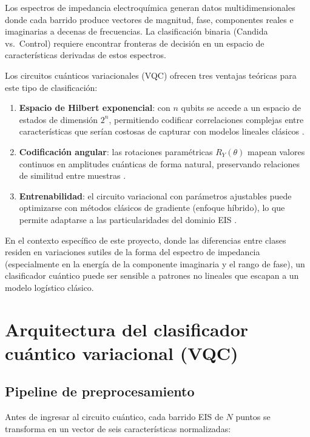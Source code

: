 \documentclass[11pt,a4paper,spanish]{book}
\begin{document}
Los espectros de impedancia electroqu\'{i}mica generan datos multidimensionales donde cada barrido produce vectores de magnitud, fase, componentes reales e imaginarias a decenas de frecuencias. La clasificaci\'{o}n binaria (Candida vs.\ Control) requiere encontrar fronteras de decisi\'{o}n en un espacio de caracter\'{i}sticas derivadas de estos espectros.

Los circuitos cu\'{a}nticos variacionales (VQC) ofrecen tres ventajas te\'{o}ricas para este tipo de clasificaci\'{o}n:

\begin{enumerate}
	\item \textbf{Espacio de Hilbert exponencial}: con $n$ qubits se accede a un espacio de estados de dimensi\'{o}n $2^n$, permitiendo codificar correlaciones complejas entre caracter\'{i}sticas que ser\'{i}an costosas de capturar con modelos lineales cl\'{a}sicos \citep{havlicek2019}.
	\item \textbf{Codificaci\'{o}n angular}: las rotaciones param\'{e}tricas $R_Y(\theta)$ mapean valores continuos en amplitudes cu\'{a}nticas de forma natural, preservando relaciones de similitud entre muestras \citep{schuld2021}.
	\item \textbf{Entrenabilidad}: el circuito variacional con par\'{a}metros ajustables puede optimizarse con m\'{e}todos cl\'{a}sicos de gradiente (enfoque h\'{i}brido), lo que permite adaptarse a las particularidades del dominio EIS \citep{pennylane2022}.
\end{enumerate}

En el contexto espec\'{i}fico de este proyecto, donde las diferencias entre clases residen en variaciones sutiles de la forma del espectro de impedancia (especialmente en la energ\'{i}a de la componente imaginaria y el rango de fase), un clasificador cu\'{a}ntico puede ser sensible a patrones no lineales que escapan a un modelo log\'{i}stico cl\'{a}sico.

\section{Arquitectura del clasificador cu\'{a}ntico variacional (VQC)}

\subsection{Pipeline de preprocesamiento}

Antes de ingresar al circuito cu\'{a}ntico, cada barrido EIS de $N$ puntos se transforma en un vector de seis caracter\'{i}sticas normalizadas:
\end{document}
